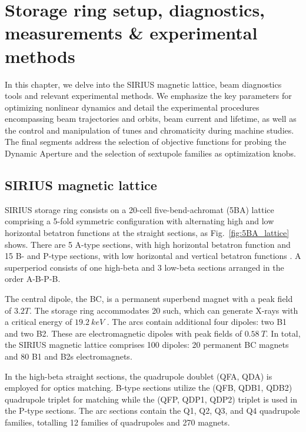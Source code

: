 \chapter{Storage ring setup, diagnostics, measurements \& experimental methods}
In this chapter, we delve into the SIRIUS magnetic lattice, beam diagnostics tools and relevant experimental methods. We emphasize the key parameters  for optimizing nonlinear dynamics and detail the experimental procedures encompassing beam trajectories and orbits, beam current and lifetime, as well as the control and manipulation of tunes and chromaticity during machine studies. The final segments address the selection of objective functions for probing the Dynamic Aperture and the selection of sextupole families as optimization knobs.

\section{SIRIUS magnetic lattice}
SIRIUS storage ring consists on a 20-cell five-bend-achromat (5BA) lattice comprising a 5-fold symmetric configuration with alternating high and low horizontal betatron functions at the straight sections, as Fig.~\ref{fig:5BA_lattice} shows. There are 5 A-type sections, with high horizontal betatron function and 15 B- and P-type sections, with low horizontal and vertical betatron functions \cite{liu_new_2016}.
A superperiod consists of one high-beta and 3 low-beta sections arranged in the order A-B-P-B.

The central dipole, the BC, is a permanent superbend magnet with a peak field of $3.2\unit{T}$. The storage ring accommodates 20 such, which can generate X-rays with a critical energy of $19.2~\unit{keV}$ \cite{liu_new_2016}. The arcs contain additional four dipoles: two B1 and two B2. These are electromagnetic dipoles with peak fields of $0.58~\unit{T}$. In total, the SIRIUS magnetic lattice comprises 100 dipoles: 20 permanent BC magnets and 80 B1 and B2s electromagnets.

In the high-beta straight sections, the quadrupole doublet (QFA, QDA) is employed for optics matching. B-type sections utilize the (QFB, QDB1, QDB2) quadrupole triplet for matching while the (QFP, QDP1, QDP2) triplet is used in the P-type sections. The arc sections contain the Q1, Q2, Q3, and Q4 quadrupole families, totalling 12 families of quadrupoles and 270 magnets.

